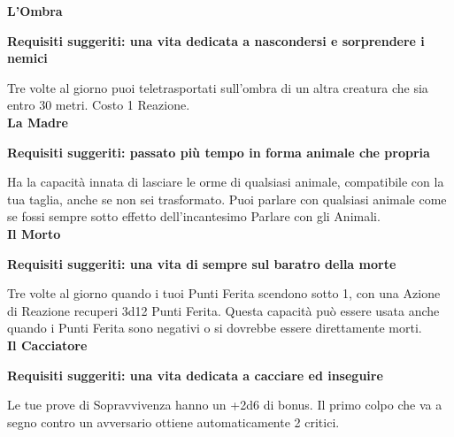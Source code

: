 \begin{multicols}{2}
\Large\textbf{L'Ombra}\normalsize{}

\textbf{Requisiti suggeriti: una vita dedicata a nascondersi e sorprendere i nemici}

Tre volte al giorno puoi teletrasportati sull'ombra di un altra creatura che sia entro 30 metri. Costo 1 Reazione.\\

\Large\textbf{La Madre}\normalsize{}

\textbf{Requisiti suggeriti: passato più tempo in forma animale che propria}

Ha la capacità innata di lasciare le orme di qualsiasi animale, compatibile con la tua taglia, anche se non sei trasformato. Puoi parlare con qualsiasi animale come se fossi sempre sotto effetto dell'incantesimo Parlare con gli Animali.\\

\Large\textbf{Il Morto}\normalsize{}

\textbf{Requisiti suggeriti: una vita di sempre sul baratro della morte}

Tre volte al giorno quando i tuoi Punti Ferita scendono sotto 1, con una Azione di Reazione recuperi 3d12 Punti Ferita. Questa capacità può essere usata anche quando i Punti Ferita sono negativi o si dovrebbe essere direttamente morti.\\

\Large\textbf{Il Cacciatore}\normalsize{}

\textbf{Requisiti suggeriti: una vita dedicata a cacciare ed inseguire}

Le tue prove di Sopravvivenza hanno un +2d6 di bonus. Il primo colpo che va a segno contro un avversario ottiene automaticamente 2 critici.

\end{multicols}

\pagebreak

